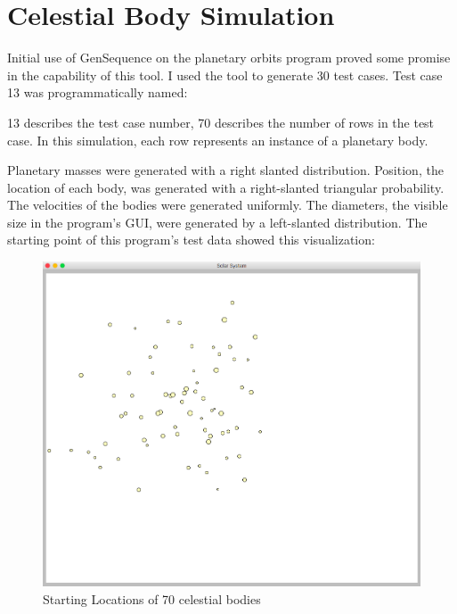 \section{Celestial Body Simulation}
Initial use of GenSequence on the planetary orbits program proved some promise in the capability of this tool. I used the tool to generate 30 test cases. Test case 13 was programmatically named:
\vspace{1cm}

\noindent{}

\vspace{1cm}
13 describes the test case number, 70 describes the number of rows in the test case. In this simulation, each row represents an instance of a planetary body.

Planetary masses were generated with a right slanted distribution. Position, the location of each body, was generated with a right-slanted triangular probability. The velocities of the bodies were generated uniformly. The diameters, the visible size in the program's GUI, were generated by a left-slanted distribution. The starting point of this program's test data showed this visualization:

\begin{figure}[h!]
\centering
\includegraphics[scale=0.4]{start-ex.png}
\caption{Starting Locations of 70 celestial bodies}
\label{fig:startbody}
\end{figure}

